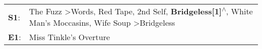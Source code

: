 \begin{supertabular}{p{0.03\textwidth}p{0.92\textwidth}}
 \textbf{S1}:  &  The Fuzz\textsuperscript{} \textgreater \enspace Words\textsuperscript{}, \enspace Red Tape\textsuperscript{}, \enspace 2nd Self\textsuperscript{}, \enspace \textbf{Bridgeless[1]\textsuperscript{$\wedge$}}, \enspace White Man's Moccasins\textsuperscript{}, \enspace Wife Soup\textsuperscript{} \textgreater \enspace Bridgeless\textsuperscript{}  \enspace  \\
 \textbf{E1}:  &                                                                                                                                                                                                                                                                                                                  Miss Tinkle's Overture\textsuperscript{}  \enspace  \\
\end{supertabular}

